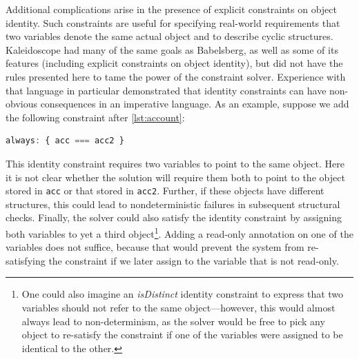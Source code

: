 \documentclass[10pt,reprint]{sigplanconf-preprint}
\begin{document}
Additional complications arise in the presence of explicit
constraints on object identity.  Such constraints are useful for
specifying real-world requirements that two variables denote the
same actual object and to describe cyclic structures.
Kaleidoscope had many of the same goals as Babelsberg, as well as some
of its features (including explicit constraints on object identity),
but did not have the rules presented here to tame the power of the
constraint solver.  Experience with that language in particular
demonstrated that identity constraints can have non-obvious
consequences in an imperative language.
As an example, suppose we add the following constraint after
\autoref{lst:account}:
\begin{lstlisting}[language=JavaScript,caption={~},label=lst:account-ident,numbers=none]
always: { acc === acc2 }
\end{lstlisting}
This identity constraint requires two variables to point to the same
object.  Here it is not clear whether the solution will require them
both to point to the object stored in \verb!acc! or that stored in
\verb!acc2!.  Further, if these objects have different structures,
this could lead to nondeterministic failures in subsequent structural
checks.  Finally, the solver could also satisfy the identity
constraint by assigning both variables to yet a third
object\footnote{One could also imagine an \emph{isDistinct} identity
  constraint to express that two variables should not refer to the
  same object---however, this would almost always lead to
  non-determinism, as the solver would be free to pick any object to
  re-satisfy the constraint if one of the variables were assigned to be
  identical to the other.}. Adding a read-only annotation on one of
the variables does not suffice, because that would prevent the system
from re-satisfying the constraint if we later assign to the variable
that is not read-only.

\end{document}

